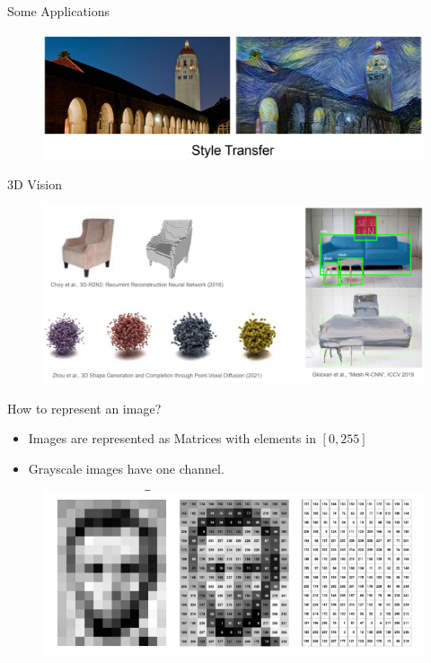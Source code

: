 \documentclass[10pt]{beamer}
\theoremstyle{remark}
\theoremstyle{definition}
\begin{document}
\begin{frame}[allowframebreaks]{Some Applications}
\framebreak

\begin{figure}
\centering
\includegraphics[width=1.0\textwidth,height=0.9\textheight,keepaspectratio]{./images/cv_12.png}
\end{figure}

\framebreak

\centering
3D Vision
\begin{figure}
\centering
\includegraphics[width=1.0\textwidth,height=0.9\textheight,keepaspectratio]{./images/cv_13.png}
\end{figure}
    
\end{frame}


\begin{frame}{How to represent an image?}
\begin{itemize}
    \item Images are represented as Matrices with elements in $[0,255]$
    \item Grayscale images have one channel.
\end{itemize}
\begin{figure}
\centering
\includegraphics[width=1.0\textwidth,height=0.7\textheight,keepaspectratio]{./images/represent_image.png}
\end{figure}

\end{frame}
\end{document}
